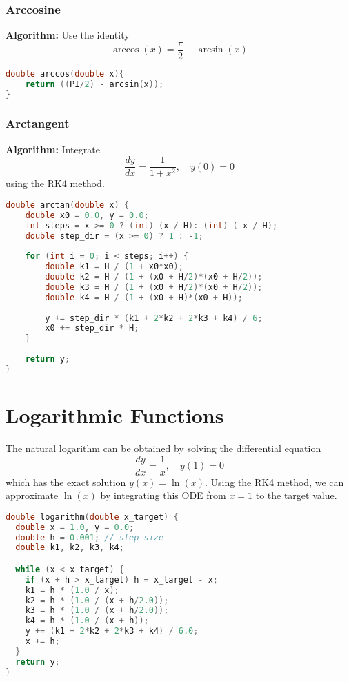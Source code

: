 \documentclass[conference]{IEEEtran}
\begin{document}
\subsubsection{Arccosine}
\textbf{Algorithm:} Use the identity
\[
\arccos(x) = \frac{\pi}{2} - \arcsin(x)
\]

\begin{lstlisting}[language=C, caption={C Implementation of Arccosine Function}]
double arccos(double x){
    return ((PI/2) - arcsin(x));
}
\end{lstlisting}
\subsubsection{Arctangent}
\textbf{Algorithm:} Integrate 
\[
\frac{dy}{dx} = \frac{1}{1+x^2}, \quad y(0)=0
\]
using the RK4 method.

\begin{lstlisting}[language=C, caption={C Implementation of Arctangent Function}]
double arctan(double x) {
    double x0 = 0.0, y = 0.0;
    int steps = x >= 0 ? (int) (x / H): (int) (-x / H); 
    double step_dir = (x >= 0) ? 1 : -1;
    
    for (int i = 0; i < steps; i++) {
        double k1 = H / (1 + x0*x0);
        double k2 = H / (1 + (x0 + H/2)*(x0 + H/2));
        double k3 = H / (1 + (x0 + H/2)*(x0 + H/2));
        double k4 = H / (1 + (x0 + H)*(x0 + H));
        
        y += step_dir * (k1 + 2*k2 + 2*k3 + k4) / 6;
        x0 += step_dir * H;
    }
    
    return y;
}
\end{lstlisting}
\section{Logarithmic Functions}

The natural logarithm can be obtained by solving the differential equation
\[
\frac{dy}{dx} = \frac{1}{x}, \quad y(1)=0
\]
which has the exact solution $y(x)=\ln(x)$. Using the RK4 method, we can approximate $\ln(x)$ by integrating this ODE from $x=1$ to the target value.

\begin{lstlisting}[language=C, caption={C Implementation of Logarithm Function using RK4}]
double logarithm(double x_target) {
  double x = 1.0, y = 0.0;
  double h = 0.001; // step size
  double k1, k2, k3, k4;

  while (x < x_target) {
    if (x + h > x_target) h = x_target - x;
    k1 = h * (1.0 / x);
    k2 = h * (1.0 / (x + h/2.0));
    k3 = h * (1.0 / (x + h/2.0));
    k4 = h * (1.0 / (x + h));
    y += (k1 + 2*k2 + 2*k3 + k4) / 6.0;
    x += h;
  }
  return y;
}
\end{lstlisting}
\end{document}
